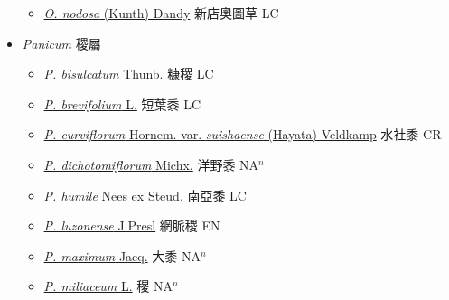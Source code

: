 \begin{itemize}
  \begin{itemize}
        \item[] \href{http://www.theplantlist.org/tpl1.1/search?q=Ottochloa+nodosa}{\textit{O. nodosa} (Kunth) Dandy}   新店奧圖草 LC
  \end{itemize}
 \item[] \textit{Panicum} 稷屬
                    
  \begin{itemize}
        \item[] \href{http://www.theplantlist.org/tpl1.1/search?q=Panicum+bisulcatum}{\textit{P. bisulcatum} Thunb.}   糠稷 LC
        \item[] \href{http://www.theplantlist.org/tpl1.1/search?q=Panicum+brevifolium}{\textit{P. brevifolium} L.}   短葉黍 LC
        \item[] \href{http://www.theplantlist.org/tpl1.1/search?q=Panicum+curviflorum+var.+suishaense}{\textit{P. curviflorum} Hornem. var. \textit{suishaense} (Hayata) Veldkamp}   水社黍 CR
        \item[] \href{http://www.theplantlist.org/tpl1.1/search?q=Panicum+dichotomiflorum}{\textit{P. dichotomiflorum} Michx.}   洋野黍 NA$^n$
        \item[] \href{http://www.theplantlist.org/tpl1.1/search?q=Panicum+humile}{\textit{P. humile} Nees ex Steud.}   南亞黍 LC
        \item[] \href{http://www.theplantlist.org/tpl1.1/search?q=Panicum+luzonense}{\textit{P. luzonense} J.Presl}   網脈稷 EN
        \item[] \href{http://www.theplantlist.org/tpl1.1/search?q=Panicum+maximum}{\textit{P. maximum} Jacq.}   大黍 NA$^n$
        \item[] \href{http://www.theplantlist.org/tpl1.1/search?q=Panicum+miliaceum}{\textit{P. miliaceum} L.}   稷 NA$^n$

\end{itemize}
\end{itemize}
